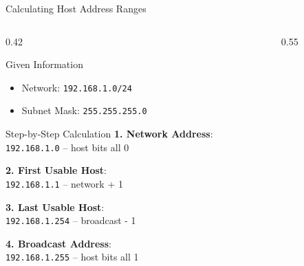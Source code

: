 \documentclass[aspectratio=169]{beamer}  %
\begin{document}
\begin{frame}{Calculating Host Address Ranges}
    \begin{columns}[T]
        \begin{column}{0.42\textwidth}
            \begin{block}{Given Information}
                \begin{itemize}
                    \item Network: \texttt{192.168.1.0/24}
                    \item Subnet Mask: \texttt{255.255.255.0}
                \end{itemize}
            \end{block}
            
            \vspace{0.3em}
            \begin{block}{Step-by-Step Calculation}
                \small
                \textbf{1. Network Address}: \\
                \quad \texttt{192.168.1.0} -- host bits all 0
                
                \vspace{0.2em}
                \textbf{2. First Usable Host}: \\
                \quad \texttt{192.168.1.1} -- network + 1
                
                \vspace{0.2em}
                \textbf{3. Last Usable Host}: \\
                \quad \texttt{192.168.1.254} -- broadcast - 1
                
                \vspace{0.2em}
                \textbf{4. Broadcast Address}: \\
                \quad \texttt{192.168.1.255} -- host bits all 1
            \end{block}
        \end{column}
        \begin{column}{0.55\textwidth}
            \begin{center}
\end{center}
\end{column}
\end{columns}
\end{frame}
\end{document}
